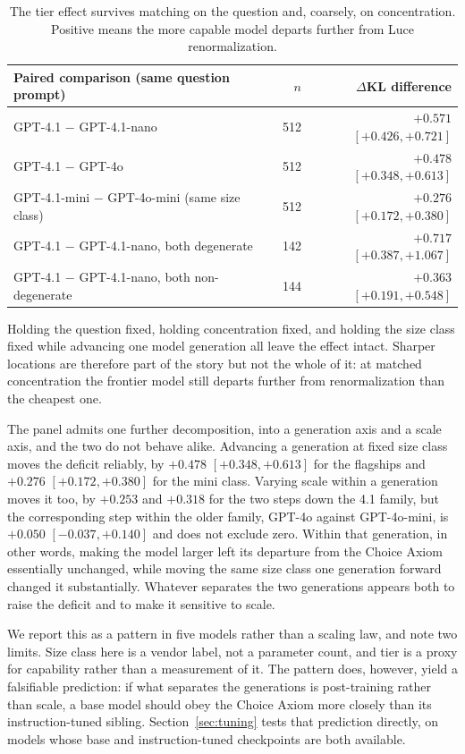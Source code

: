 \documentclass[11pt]{article}
\begin{document}
\begin{table}[ht]
\centering
\small
\begin{tabular}{lrr}
\toprule
Paired comparison (same question prompt) & $n$ & $\Delta$KL difference \\
\midrule
GPT-4.1 $-$ GPT-4.1-nano & 512 & $+0.571$ $[+0.426, +0.721]$ \\
GPT-4.1 $-$ GPT-4o & 512 & $+0.478$ $[+0.348, +0.613]$ \\
GPT-4.1-mini $-$ GPT-4o-mini (same size class) & 512 & $+0.276$ $[+0.172, +0.380]$ \\
GPT-4.1 $-$ GPT-4.1-nano, both degenerate & 142 & $+0.717$ $[+0.387, +1.067]$ \\
GPT-4.1 $-$ GPT-4.1-nano, both non-degenerate & 144 & $+0.363$ $[+0.191, +0.548]$ \\
\bottomrule
\end{tabular}
\caption{The tier effect survives matching on the question and, coarsely, on
concentration. Positive means the more capable model departs further from
Luce renormalization.}
\label{tab:tier}
\end{table}

Holding the question fixed, holding concentration fixed, and holding the
size class fixed while advancing one model generation all leave the effect
intact. Sharper locations are therefore part of the story but not the whole
of it: at matched concentration the frontier model still departs further
from renormalization than the cheapest one.

The panel admits one further decomposition, into a generation axis and a
scale axis, and the two do not behave alike. Advancing a generation at
fixed size class moves the deficit reliably, by $+0.478$
$[+0.348, +0.613]$ for the flagships and $+0.276$ $[+0.172, +0.380]$ for
the mini class. Varying scale within a generation moves it too, by
$+0.253$ and $+0.318$ for the two steps down the 4.1 family, but the
corresponding step within the older family, GPT-4o against GPT-4o-mini, is
$+0.050$ $[-0.037, +0.140]$ and does not exclude zero. Within that
generation, in other words, making the model larger left its departure from
the Choice Axiom essentially unchanged, while moving the same size class one
generation forward changed it substantially. Whatever separates the two
generations appears both to raise the deficit and to make it sensitive to
scale.

We report this as a pattern in five models rather than a scaling law, and
note two limits. Size class here is a vendor label, not a parameter count,
and tier is a proxy for capability rather than a measurement of it. The
pattern does, however, yield a falsifiable prediction: if what separates
the generations is post-training rather than scale, a base model should
obey the Choice Axiom more closely than its instruction-tuned sibling.
Section~\ref{sec:tuning} tests that prediction directly, on models whose
base and instruction-tuned checkpoints are both available.
\end{document}
